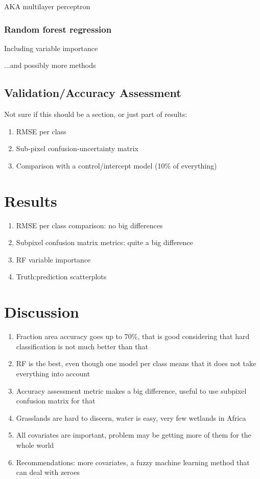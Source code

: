 \documentclass[a4paper,10pt]{article}
\begin{document}
AKA multilayer perceptron

\subsubsection{Random forest regression}

Including variable importance

...and possibly more methods

\subsection{Validation/Accuracy Assessment}

Not sure if this should be a section, or just part of results:

\begin{enumerate}
 \item RMSE per class
 \item Sub-pixel confusion-uncertainty matrix
 \item Comparison with a control/intercept model (10\% of everything)
\end{enumerate}

\section{Results}

\begin{enumerate}
 \item RMSE per class comparison: no big differences
 \item Subpixel confusion matrix metrics: quite a big difference
 \item RF variable importance
 \item Truth:prediction scatterplots
\end{enumerate}

\section{Discussion}

\begin{enumerate}
 \item Fraction area accuracy goes up to 70\%, that is good considering that hard classification is not much better than that
 \item RF is the best, even though one model per class means that it does not take everything into account
 \item Accuracy assessment metric makes a big difference, useful to use subpixel confusion matrix for that
 \item Grasslands are hard to discern, water is easy, very few wetlands in Africa
 \item All covariates are important, problem may be getting more of them for the whole world
 \item Recommendations: more covariates, a fuzzy machine learning method that can deal with zeroes
\end{enumerate}
\end{document}
